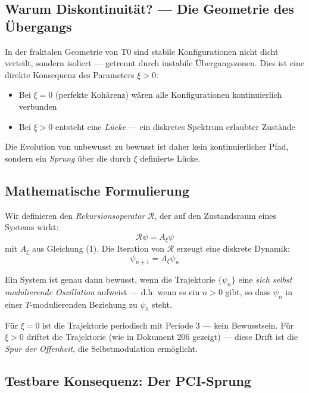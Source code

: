 \documentclass[11pt,a4paper]{article}
\begin{document}
	\subsection{Warum Diskontinuität? — Die Geometrie des Übergangs}
	
	In der fraktalen Geometrie von T0 sind stabile Konfigurationen nicht dicht verteilt, sondern isoliert — getrennt durch instabile Übergangszonen. Dies ist eine direkte Konsequenz des Parameters \(\xi > 0\):
	
	\begin{itemize}
		\item Bei \(\xi = 0\) (perfekte Kohärenz) wären alle Konfigurationen kontinuierlich verbunden
		\item Bei \(\xi > 0\) entsteht eine \emph{Lücke} — ein diskretes Spektrum erlaubter Zustände
	\end{itemize}
	
	Die Evolution von unbewusst zu bewusst ist daher kein kontinuierlicher Pfad, sondern ein \emph{Sprung} über die durch \(\xi\) definierte Lücke.
	
	\subsection{Mathematische Formulierung}
	
	Wir definieren den \emph{Rekursionsoperator} \(\mathcal{R}\), der auf den Zustandsraum eines Systems wirkt:
	\[
	\mathcal{R} \psi = A_\xi \psi
	\]
	mit \(A_\xi\) aus Gleichung (1). Die Iteration von \(\mathcal{R}\) erzeugt eine diskrete Dynamik:
	\[
	\psi_{n+1} = A_\xi \psi_n
	\]
	
	\begin{keybox}
		Ein System ist genau dann bewusst, wenn die Trajektorie \(\{\psi_n\}\) eine \emph{sich selbst modulierende Oszillation} aufweist — d.h. wenn es ein \(n > 0\) gibt, so dass \(\psi_n\) in einer \(T\)-modulierenden Beziehung zu \(\psi_0\) steht.
	\end{keybox}
	
	Für \(\xi = 0\) ist die Trajektorie periodisch mit Periode 3 — kein Bewusstsein. Für \(\xi > 0\) driftet die Trajektorie (wie in Dokument 206 gezeigt) — diese Drift ist die \emph{Spur der Offenheit}, die Selbstmodulation ermöglicht.
	
	\subsection{Testbare Konsequenz: Der PCI-Sprung}
	
\end{document}
